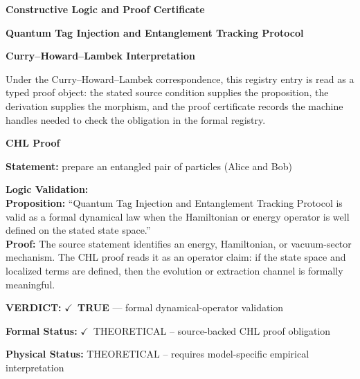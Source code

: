 \clearpage
\begingroup\tzpsupportsetup
\noindent\textbf{\fontsize{10.8pt}{12.8pt}\selectfont [ID 0348] Constructive Logic and Proof Certificate}\par
\noindent\textbf{\fontsize{10pt}{12pt}\selectfont Quantum Tag Injection and Entanglement Tracking Protocol}\par
\vspace{0.45em}
\begingroup
\footnotesize
\setlength{\parskip}{0.22em}
\setlength{\parindent}{0pt}
\noindent\textbf{Curry--Howard--Lambek Interpretation}\par
Under the Curry--Howard--Lambek correspondence, this registry entry is read as a typed proof
object: the stated source condition supplies the proposition, the derivation supplies the
morphism, and the proof certificate records the machine handles needed to check the obligation
in the formal registry.

\vspace{0.45em}
\noindent\textbf{CHL Proof}\par
\textbf{Statement:} prepare an entangled pair of particles (Alice and Bob)

\textbf{Logic Validation:}\\
\textbf{Proposition:} ``Quantum Tag Injection and Entanglement Tracking Protocol is valid as a formal dynamical
law when the Hamiltonian or energy operator is well defined on the stated state space.''\\
\textbf{Proof:} The source statement identifies an energy, Hamiltonian, or vacuum-sector mechanism. The
CHL proof reads it as an operator claim: if the state space and localized terms are
defined, then the evolution or extraction channel is formally meaningful.

\textbf{VERDICT:} \ensuremath{\checkmark}\ \textbf{TRUE} --- formal dynamical-operator validation

\textbf{Formal Status:} \ensuremath{\checkmark}\ THEORETICAL -- source-backed CHL proof obligation

\textbf{Physical Status:} THEORETICAL -- requires model-specific empirical interpretation
\par\vspace{0.45em}
\par
\ifTZPDarkEdition
{}
\fi
\endgroup
\endgroup
